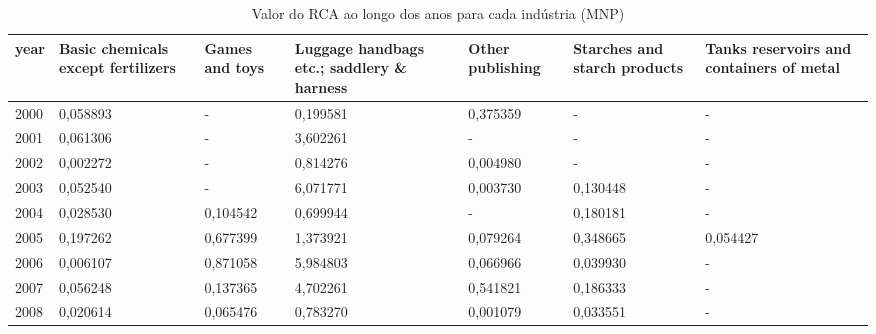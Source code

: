 \begin{table}
\centering
\caption{Valor do RCA ao longo dos anos para cada indústria (MNP)}
\begin{tabular}{p{1cm}p{2cm}p{2cm}p{2cm}p{2cm}p{2cm}p{2cm}}
\toprule
 year &  Basic chemicals except fertilizers &  Games and toys &  Luggage handbags etc.; saddlery \& harness &  Other publishing &  Starches and starch products &  Tanks reservoirs and containers of metal \\
\midrule
 2000 &                            0,058893 &               - &                                   0,199581 &          0,375359 &                             - &                                         - \\
 2001 &                            0,061306 &               - &                                   3,602261 &                 - &                             - &                                         - \\
 2002 &                            0,002272 &               - &                                   0,814276 &          0,004980 &                             - &                                         - \\
 2003 &                            0,052540 &               - &                                   6,071771 &          0,003730 &                      0,130448 &                                         - \\
 2004 &                            0,028530 &        0,104542 &                                   0,699944 &                 - &                      0,180181 &                                         - \\
 2005 &                            0,197262 &        0,677399 &                                   1,373921 &          0,079264 &                      0,348665 &                                  0,054427 \\
 2006 &                            0,006107 &        0,871058 &                                   5,984803 &          0,066966 &                      0,039930 &                                         - \\
 2007 &                            0,056248 &        0,137365 &                                   4,702261 &          0,541821 &                      0,186333 &                                         - \\
 2008 &                            0,020614 &        0,065476 &                                   0,783270 &          0,001079 &                      0,033551 &                                         - \\

\end{tabular}
\end{table}
